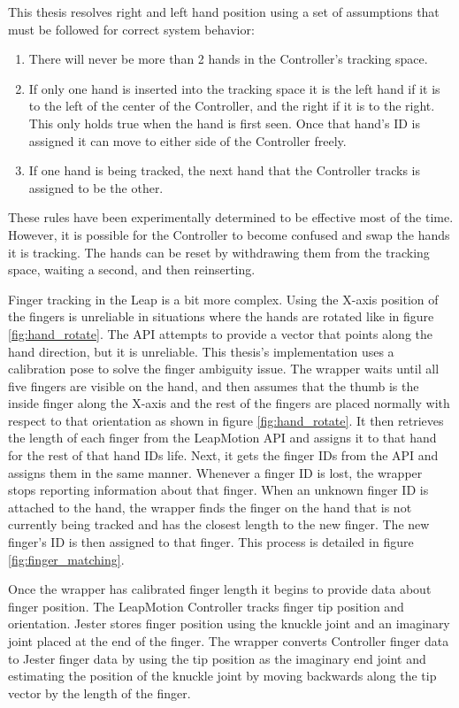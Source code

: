 This thesis resolves right and left hand position using a set of assumptions that must be followed for correct system behavior:

\begin{enumerate}
	\item There will never be more than 2 hands in the Controller's tracking space.
	\item If only one hand is inserted into the tracking space it is the left hand if it is to the left of the center of the Controller, and the right if it is to the right. This only holds true when the hand is first seen. Once that hand's ID is assigned it can move to either side of the Controller freely.
	\item If one hand is being tracked, the next hand that the Controller tracks is assigned to be the other.
\end{enumerate}

These rules have been experimentally determined to be effective most of the time. However, it is possible for the Controller to become confused and swap the hands it is tracking. The hands can be reset by withdrawing them from the tracking space, waiting a second, and then reinserting.

Finger tracking in the Leap is a bit more complex. Using the X-axis position of the fingers is unreliable in situations where the hands are rotated like in figure \ref{fig:hand_rotate}. The API attempts to provide a vector that points along the hand direction, but it is unreliable. This thesis's implementation uses a calibration pose to solve the finger ambiguity issue. The wrapper waits until all five fingers are visible on the hand, and then assumes that the thumb is the inside finger along the X-axis and the rest of the fingers are placed normally with respect to that orientation as shown in figure \ref{fig:hand_rotate}. It then retrieves the length of each finger from the LeapMotion API and assigns it to that hand for the rest of that hand IDs life. Next, it gets the finger IDs from the API and assigns them in the same manner. Whenever a finger ID is lost, the wrapper stops reporting information about that finger. When an unknown finger ID is attached to the hand, the wrapper finds the finger on the hand that is not currently being tracked and has the closest length to the new finger. The new finger's ID is then assigned to that finger. This process is detailed in figure \ref{fig:finger_matching}. 

Once the wrapper has calibrated finger length it begins to provide data about finger position. The LeapMotion Controller tracks finger tip position and orientation. Jester stores finger position using the knuckle joint and an imaginary joint placed at the end of the finger. The wrapper converts Controller finger data to Jester finger data by using the tip position as the imaginary end joint and estimating the position of the knuckle joint by moving backwards along the tip vector by the length of the finger.

